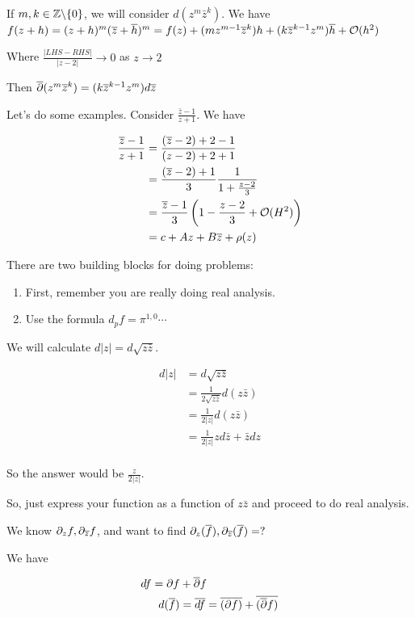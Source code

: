 \documentclass[x11names,reqno,14pt]{extarticle}
\begin{document}
\claim If $m, k \in \mathbb{Z}\backslash\{0\}$, we will consider $d(z^m\bar{z}^k)$. We have $f(z + h) = (z + h)^m(\overline{z} + \overline{h})^m = f(z) + (mz^{m-1}\overline{z}^k)h + (k\overline{z}^{k - 1}z^m)\overline{h} + \mathcal{O}(h^2)$

Where $\frac{|LHS - RHS|}{|z - 2|} \to 0$ as $z\to 2$

Then $\overline{\partial}(z^m\overline{z}^k) = (k\overline{z}^{k - 1}z^m)d\overline{z}$

\proof



Let's do some examples. Consider $\frac{\bar{z} - 1}{z + 1}$. We have

\begin{align*}
\frac{\overline{z} - 1}{z + 1}  & = \frac{(\overline{z} - 2) + 2 - 1}{(z - 2) + 2 + 1}  \\ & = \frac{(\overline{z} - 2) + 1}{3}\frac{1}{1 + \frac{z - 2}{3}}\\ &  = \frac{\overline{z} - 1}{3}\left(1 - \frac{z - 2}{3} + \mathcal{O}(H^2)\right)\\ & = c + Az + B\overline{z} + \rho(z)
\end{align*}

There are two building blocks for doing problems: 
\begin{enumerate}
\item First, remember you are really doing real analysis. 
\item Use the formula $d_pf = \pi^{1, 0}\cdots $
\end{enumerate}

\exm

We will calculate $d|z| = d\sqrt{z\bar{z}}$.

\begin{align*}
d|z| & = d\sqrt{z\bar{z}}\\
& = \frac{1}{2\sqrt{z\bar{z}}}d(z\bar{z})\\
& = \frac{1}{2|z|}d(z\bar{z})\\ & = \frac{1}{2|z|}zd\bar{z} + \bar{z}dz \\
\end{align*}

So the answer would be $\frac{z}{2|z|}$. 

So, just express your function as a function of $z\bar{z}$ and proceed to do real analysis. 

We know $\partial_zf, \partial_{\overline{z}}f$, and want to find $\partial_z(\overline{f}), \partial_{\overline{z}}(\overline{f}) = ?$

We have

\begin{align*}
df = \partial f & + \overline{\partial}f \\
d(\overline{f})  &= \overline{df} = \overline{(\partial f)} + \overline{(\overline{\partial}f)} \\
\end{align*}
\end{document}
